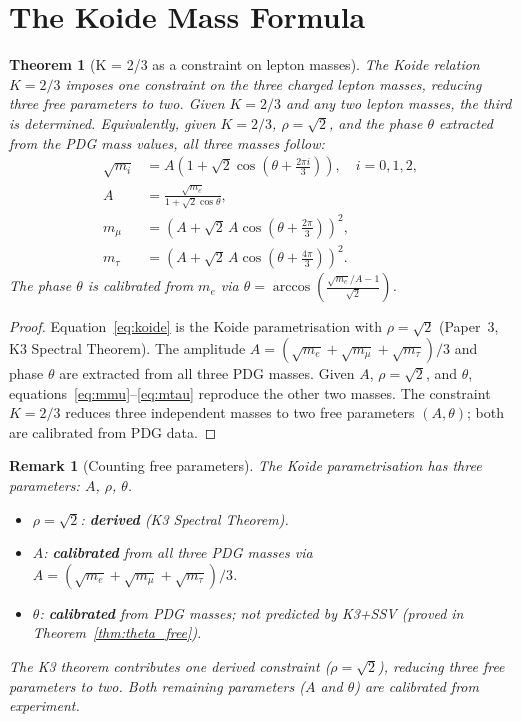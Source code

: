 \documentclass[11pt]{article}
\newtheorem{theorem}{Theorem}[section]
\newtheorem{remark}{Remark}[section]
\begin{document}
\section{The Koide Mass Formula}

\begin{theorem}[K = 2/3 as a constraint on lepton masses]
\label{thm:masses}
The Koide relation $K = 2/3$ imposes one constraint on the three
charged lepton masses, reducing three free parameters to two.
Given $K = 2/3$ and any two lepton masses, the third is determined.
Equivalently, given $K = 2/3$, $\rho = \sqrt{2}$, and the phase
$\theta$ extracted from the PDG mass values, all three masses follow:
\begin{align}
\sqrt{m_i} &= A\!\left(1 + \sqrt{2}\cos\!\left(\theta + \tfrac{2\pi i}{3}\right)\right),
\quad i = 0,1,2, \label{eq:koide}\\
A &= \frac{\sqrt{m_e}}{1+\sqrt{2}\cos\theta}, \label{eq:A}\\
m_\mu &= \left(A + \sqrt{2}\,A\cos\!\left(\theta+\tfrac{2\pi}{3}\right)\right)^2,
\label{eq:mmu}\\
m_\tau &= \left(A + \sqrt{2}\,A\cos\!\left(\theta+\tfrac{4\pi}{3}\right)\right)^2.
\label{eq:mtau}
\end{align}
The phase $\theta$ is calibrated from $m_e$ via
$\theta = \arccos\!\left(\frac{\sqrt{m_e}/A - 1}{\sqrt{2}}\right)$.
\end{theorem}

\begin{proof}
Equation~\eqref{eq:koide} is the Koide parametrisation with $\rho = \sqrt{2}$
(Paper~3, K3 Spectral Theorem).  The amplitude $A = (\sqrt{m_e}+\sqrt{m_\mu}+
\sqrt{m_\tau})/3$ and phase $\theta$ are extracted from all three PDG masses.
Given $A$, $\rho = \sqrt{2}$, and $\theta$, equations~\eqref{eq:mmu}--\eqref{eq:mtau}
reproduce the other two masses.  The constraint $K = 2/3$ reduces three
independent masses to two free parameters $(A, \theta)$; both are
calibrated from PDG data.
\end{proof}

\begin{remark}[Counting free parameters]
The Koide parametrisation has three parameters: $A$, $\rho$, $\theta$.
\begin{itemize}
\item $\rho = \sqrt{2}$: \textbf{derived} (K3 Spectral Theorem).
\item $A$: \textbf{calibrated} from all three PDG masses via
  $A = (\sqrt{m_e}+\sqrt{m_\mu}+\sqrt{m_\tau})/3$.
\item $\theta$: \textbf{calibrated} from PDG masses; not predicted by K3+SSV
  (proved in Theorem~\ref{thm:theta_free}).
\end{itemize}
The K3 theorem contributes one derived constraint ($\rho = \sqrt{2}$),
reducing three free parameters to two.  Both remaining parameters
($A$ and $\theta$) are calibrated from experiment.
\end{remark}
\end{document}
